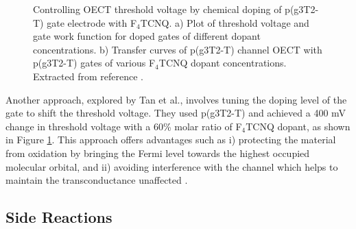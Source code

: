  \begin{figure}[ht]
	\centering
	\hspace{2em}
	\caption[Tuning of threshold voltage with different levels of doping p(g3T2-T)]{Controlling OECT threshold voltage by chemical doping of p(g3T2-T) gate electrode with F$_{4}$TCNQ. a) Plot of threshold voltage and gate work function for doped gates of different dopant concentrations. b) Transfer curves of p(g3T2-T) channel OECT %
	with p(g3T2-T) gates of various F$_{4}$TCNQ dopant concentrations. Extracted from reference \cite{tanTuningOrganicElectrochemical2022}.}
	\label{fig:tune}
\end{figure}

Another approach, explored by Tan et al., involves tuning the doping level of the gate to shift the threshold voltage. They used p(g3T2-T) and achieved a 400 mV change in threshold voltage with a 60\% molar ratio of %
F$_{4}$TCNQ dopant, as shown in Figure \ref{fig:tune}. This approach offers advantages such as i) protecting the material from oxidation by bringing the Fermi level towards the highest occupied molecular orbital, and ii) avoiding interference with the channel which helps to maintain the transconductance unaffected \cite{tanTuningOrganicElectrochemical2022}.


\subsection{Side Reactions} \label{subsec:sidereac}

